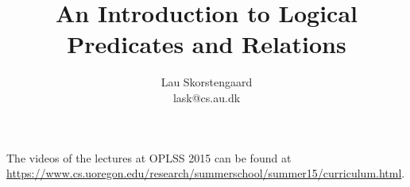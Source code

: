\documentclass[a4paper,10pt,fleqn]{article}
\author{Lau Skorstengaard\\lask@cs.au.dk}
\title{An Introduction to Logical Predicates and Relations}
\begin{document}
\maketitle The videos of the lectures at OPLSS 2015 can be found at \url{https://www.cs.uoregon.edu/research/summerschool/summer15/curriculum.html}. 

\end{document}
